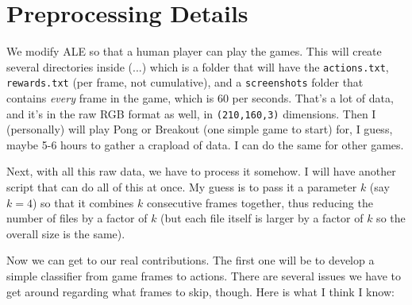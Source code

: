 \documentclass[letterpaper, 10pt, conference]{ieeeconf}
\begin{document}
\appendices

\section{Preprocessing Details}\label{app:preprocessing_details}

We modify ALE so that a human player can play the games. This will
    create several directories inside (...)
    which is a folder that will have the \texttt{actions.txt},
    \texttt{rewards.txt} (per frame, not cumulative), and a \texttt{screenshots}
    folder that contains \emph{every} frame in the game, which is 60 per
    seconds. That's a lot of data, and it's in the raw RGB format as well, in
    \texttt{(210,160,3)} dimensions.  Then I (personally) will play Pong or
    Breakout (one simple game to start) for, I guess, maybe 5-6 hours to gather
    a crapload of data. I can do the same for other games.

Next, with all this raw data, we have to process it somehow. I will
    have another script that can do all of this at once. My guess is to pass it
    a parameter $k$ (say $k=4$) so that it combines $k$ consecutive frames
    together, thus reducing the number of files by a factor of $k$ (but each
    file itself is larger by a factor of $k$ so the overall size is the same).

Now we can get to our real contributions. The first one will be to
    develop a simple classifier from game frames to actions. There are several
    issues we have to get around regarding what frames to skip, though. Here is
    what I think I know:
\end{document}
